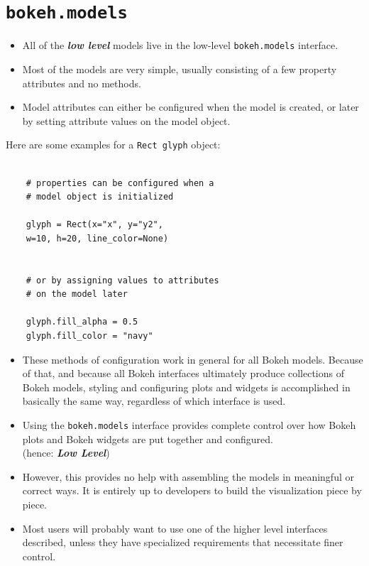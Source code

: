 \documentclass[12pt, a4paper]{report}
\begin{document}
\section*{\texttt{bokeh.models}}

\begin{itemize}
	\item All of the \textbf{\textit{low level}} models live in the low-level \texttt{bokeh.models} interface. \item Most of the models are very simple, usually consisting of a few property attributes and no methods. 
	\item Model attributes can either be configured when the model is created, or later by setting attribute values on the model object. 
	
\end{itemize}

Here are some examples for a \texttt{Rect glyph} object:

\begin{framed}
	\begin{verbatim}
	
	# properties can be configured when a 
	# model object is initialized
	
	glyph = Rect(x="x", y="y2", 
	w=10, h=20, line_color=None)
	
	
	# or by assigning values to attributes
	# on the model later
	
	glyph.fill_alpha = 0.5
	glyph.fill_color = "navy"
	\end{verbatim}
\end{framed}
\newpage
{
	\Large
\begin{itemize}
	\item These methods of configuration work in general for all Bokeh models. Because of that, and because all Bokeh interfaces ultimately produce collections of Bokeh models, styling and configuring plots and widgets is accomplished in basically the same way, regardless of which interface is used.
	\smallskip
	\item Using the \texttt{bokeh.models} interface provides complete control over how Bokeh plots and Bokeh widgets are put together and configured.\\ (hence:  \textbf{\textit{Low Level}}) 
		\smallskip
	\item However, this provides no help with assembling the models in meaningful or correct ways. It is entirely up to developers to build the visualization piece by piece.
		\smallskip
	\item Most users will probably want to use one of the higher level interfaces described, unless they have specialized requirements that necessitate finer control. 
\end{itemize}
}
\newpage
\end{document}
